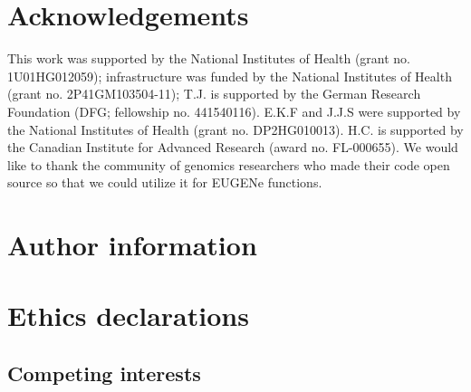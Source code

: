\section{Acknowledgements}

This work was supported by the National Institutes of Health (grant no. 1U01HG012059); infrastructure was funded by the National Institutes of Health (grant no. 2P41GM103504-11); T.J. is supported by the German Research Foundation (DFG; fellowship no. 441540116). E.K.F and J.J.S were supported by the National Institutes of Health (grant no. DP2HG010013). H.C. is supported by the Canadian Institute for Advanced Research (award no. FL-000655). We would like to thank the community of genomics researchers who made their code open source so that we could utilize it for EUGENe functions.

\section{Author information}

\section{Ethics declarations}

\subsection{Competing interests}
